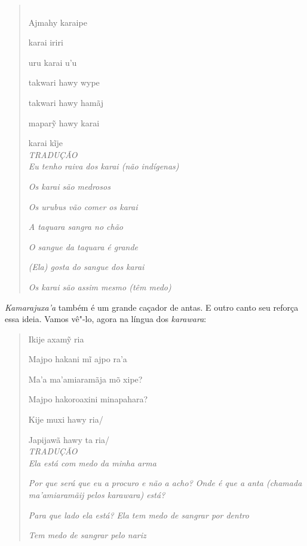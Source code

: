 \begin{quote}
\forceindent
{} \\

Ajmahy karaipe

karai iriri

uru karai u'u

takwari hawy wype

takwari hawy hamãj

maparỹ hawy karai

karai kĩje\\

\emph{TRADUÇÃO}\\

\emph{Eu tenho raiva dos \emph{karai} (não indígenas)}

\emph{Os \emph{karai} são medrosos}

\emph{Os urubus vão comer os \emph{karai}}

\emph{A taquara sangra no chão}

\emph{O sangue da taquara é grande}

\emph{(Ela) gosta do sangue dos \emph{karai}}

\emph{Os \emph{karai são assim mesmo} (têm medo)}
\end{quote}

\emph{Kamarajuxa'a} também é um grande caçador de antas. E outro canto
seu reforça essa ideia. Vamos vê"-lo, agora na língua dos
\emph{karawara}:

\begin{quote}
\forceindent
Ikije axamỹ ria

Majpo hakani mĩ ajpo ra'a 

Ma'a ma'amiaramãja mõ xipe?

Majpo hakoroaxini minapahara?

Kije muxi hawy ria/

Japijawã hawy ta ria/\\

\emph{TRADUÇÃO}\\

\emph{Ela está com medo da minha arma}

\emph{Por que será que eu a procuro e não a acho? Onde é que a anta (chamada
\emph{ma'amiaramãij} pelos \emph{karawara}) está?}

\emph{Para que lado ela está? Ela tem medo de sangrar por dentro}

\emph{Tem medo de sangrar pelo nariz}
\end{quote}

